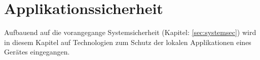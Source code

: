 \section{Applikationssicherheit}
	Aufbauend auf die vorangegange Systemsicherheit (Kapitel: \ref{sec:systemsec})
	wird in diesem Kapitel auf Technologien zum Schutz der lokalen Applikationen
	eines Gerätes eingegangen.